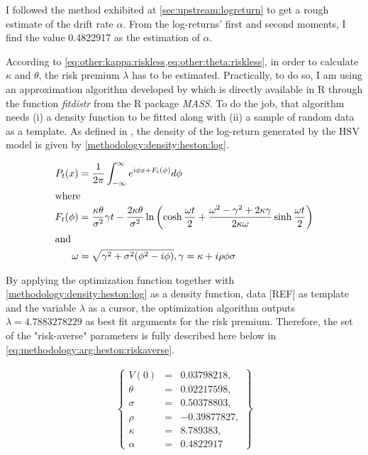 \documentclass[12pt]{report}
\begin{document}
I followed the method exhibited at \cref{sec:upstream:logreturn} to get a rough estimate of the drift rate $\alpha$. From the log-returns' first and second moments, I find the value 0.4822917 as the estimation of $\alpha$.

According to \cref{eq:other:kappa:riskless,eq:other:theta:riskless}, in order to  calculate $\kappa$ and $\theta$, the risk premium $\lambda$ has to be estimated.
Practically, to do so, I am using an approximation algorithm developed by \cite{MASS} which is directly available in R through the function \textit{fitdistr} from the R package \textit{MASS}. 
To do the job, that algorithm needs (i) a density function to be fitted along with (ii) a sample of random data as a template.
As defined in \citet{Adrian}, the density of the log-return generated by the HSV model is given by \cref{methodology:density:heston:log}.

\begin{align}
P_t(x) &= \frac{1}{2 \pi} \int_{-\infty}^{\infty} e^{i \phi x + F_t(\phi)} d\phi \label{methodology:density:heston:log} \\
\intertext{where}
F_t(\phi) &= \frac{\kappa \theta}{\sigma^2} \gamma t -
  \frac{2 \kappa \theta}{\sigma ^2} \ln\left(
    \cosh \frac{\omega t}{2} +
    \frac{\omega^2 - \gamma^2 +2 \kappa \gamma}{2 \kappa \omega} \sinh \frac{\omega t}{2}
  \right) \notag \\
\intertext{and}
\omega &= \sqrt{\gamma^2 + \sigma^2 (\phi^2 - i\phi)}, \notag
\gamma = \kappa + i \rho \phi \sigma \notag
\end{align}

By applying the optimization function together with \cref{methodology:density:heston:log} as a density function, data [REF] as template and the variable $\lambda$ as a cursor, the optimization algorithm outputs $\lambda = 4.7883278229$ as best fit arguments for the risk premium.
Therefore, the set of the "risk-averse" parameters is fully described here below in \ref{eq:methodology:arg:heston:riskaverse}.

\begin{align}
  \left \{
  \begin{array}{lcl}
    V(0) &= &0.03798218, \\
    \theta &= &0.02217598, \\
    \sigma &= &0.50378803, \\
    \rho &= &-0.39877827, \\
    \kappa &= &8.789383, \\
    \alpha & = &0.4822917
  \end{array}
  \right \}  
  \label{eq:methodology:arg:heston:riskaverse}
\end{align}
\end{document}
